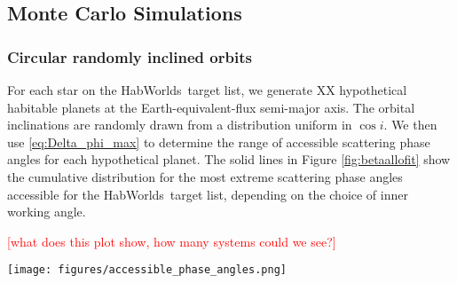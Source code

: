 \documentclass[
    usenatbib,
]{mnras}
\newcommand{\todo}[1]{\textcolor{red}{[#1]}}
\newcommand{\timmy}[1]{\textcolor{red}{[\textbf{Timmy:} #1]}} %
\newcommand{\hwo}{HabWorlds}
\begin{document}

\subsection{Monte Carlo Simulations}

\subsubsection{Circular randomly inclined orbits}
\label{sec:circular}

For each star on the \hwo\ target list, we generate XX hypothetical habitable planets at the Earth-equivalent-flux semi-major axis. 
%
The orbital inclinations are randomly drawn from a distribution uniform in $\cos i$. 
%
We then use \cref{eq:Delta_phi_max} to determine the range of accessible scattering phase angles for each hypothetical planet. 
The solid lines in Figure \ref{fig:betaallofit} show the cumulative distribution for the most extreme scattering phase angles accessible for the \hwo\ target list, depending on the choice of inner working angle.  

\todo{what does this plot show, how many systems could we see?}


\begin{figure*}[t]
    \centering
    \texttt{[image: figures/accessible\_phase\_angles.png]}  
    \caption{
        The big kahuna
        \timmy{What are the dashed vs. solid lines?}
        \timmy{How did this plot aggregate the simulations for each planet? mean? median? min/max?
        }
    }
    \label{fig:betaallofit}
\end{figure*}
\end{document}
